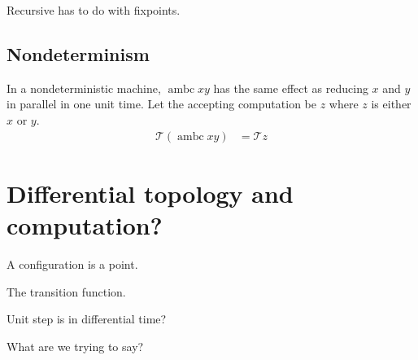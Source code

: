 \documentclass[10pt,statementpaper]{memoir}
\theoremstyle{definition}
\newcommand\TC{\mathcal{T}}
\newcommand\ambc{\operatorname{ambc}}
\begin{document}
Recursive has to do with fixpoints.

\section{Nondeterminism}

In a nondeterministic machine, $\ambc x y$
has the same effect as reducing $x$ and $y$ in parallel in one unit time.
Let the accepting computation be $z$ where $z$ is either $x$ or $y$.
\begin{align}
    \TC(\ambc xy) &= \TC z
\end{align}

\chapter{Differential topology and computation?}

A configuration is a point.

The transition function.

Unit step is in differential time?

What are we trying to say?

\backmatter


\end{document}
